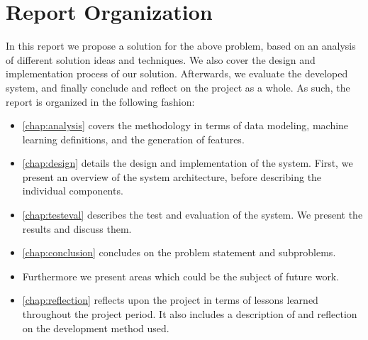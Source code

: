 \section{Report Organization}
In this report we propose a solution for the above problem, based on an analysis of different solution ideas and techniques. We also cover the design and implementation process of our solution. Afterwards, we evaluate the developed system, and finally conclude and reflect on the project as a whole. As such, the report is organized in the following fashion:

\begin{itemize}
	\item \cref{chap:analysis} covers the methodology in terms of data modeling, machine learning definitions, and the generation of features.
  \item \cref{chap:design} details the design and implementation of the system. First, we present an overview of the system architecture, before describing the individual components.
  \item \cref{chap:testeval} describes the test and evaluation of the system. We present the results and discuss them.
  \item \cref{chap:conclusion} concludes on the problem statement and subproblems.
  \item {} Furthermore we present areas which could be the subject of future work.
  \item \cref{chap:reflection} reflects upon the project in terms of lessons learned throughout the project period. It also includes a description of and reflection on the development method used.

\end{itemize}

